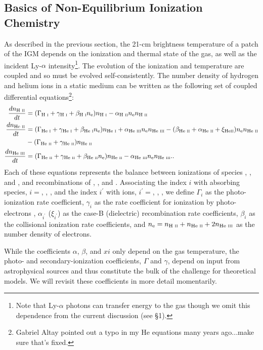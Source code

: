 \subsection{Basics of Non-Equilibrium Ionization Chemistry} \label{sec:ioniz_heating}
As described in the previous section, the 21-cm brightness temperature of a patch of the IGM depends on the ionization and thermal state of the gas, as well as the incident Ly-$\alpha$ intensity\footnote{Note that Ly-$\alpha$ photons can transfer energy to the gas though we omit this dependence from the current discussion (see \S1).}. The evolution of the ionization and temperature are coupled and so must be evolved self-consistently. The number density of hydrogen and helium ions {\color{red} in a static medium} can be written as the following set of coupled differential equations\footnote{{\color{red} Gabriel Altay pointed out a typo in my He equations many years ago...make sure that's fixed.}}:
\begin{align}
    \frac{d n_{\text{H } \textsc{ii}}}{dt} & = (\Gamma_{\text{H } \textsc{i}} + \gamma_{\text{H } \textsc{i}} + \beta_{\text{H } \textsc{i}} n_{\text{e}}) n_{\text{H } \textsc{i}} - \alpha_{\text{H } \textsc{ii}} n_{\text{e}} n_{\text{H } \textsc{ii}}   \label{eq:HIIRateEquation} \\
    \frac{d n_{\text{He } \textsc{ii}}}{dt} & = (\Gamma_{\text{He } \textsc{i}} + \gamma_{\text{He } \textsc{i}} + \beta_{\text{He } \textsc{i}} n_{\text{e}}) n_{\text{He } \textsc{i}} \nonumber + \alpha_{\text{He } \textsc{iii}} n_{\text{e}} n_{\text{He } \textsc{iii}}  - (\beta_{\text{He } \textsc{ii}} + \alpha_{\text{He } \textsc{ii}} + \xi_{\text{He} \textsc{ii}}) n_{\text{e}} n_{\text{He } \textsc{ii}} \\ & - (\Gamma_{\text{He } \textsc{ii}} + \gamma_{\text{He } \textsc{ii}}) n_{\text{He } \textsc{ii}} \label{eq:HeIIRateEquation} \\ 
    \frac{d n_{\text{He } \textsc{iii}}}{dt} & = (\Gamma_{\text{He } \textsc{ii}} + \gamma_{\text{He } \textsc{ii}} + \beta_{\text{He } \textsc{ii}} n_{\text{e}}) n_{\text{He } \textsc{ii}}  - \alpha_{\text{He } \textsc{iii}} n_{\text{e}} n_{\text{He } \textsc{iii}} . \label{eq:HeIIIRateEquation} .
\end{align}
Each of these equations represents the balance between ionizations of species
\HI, \HeI, and \HeII, and recombinations of \HII, \HeII, and
\HeIII. Associating the index $i$ with absorbing species, $i = $\HI, \HeI,
\HeII, and the index $i^{\prime}$ with ions, $i^{\prime} = $\HII, \HeII,
\HeIII, we define $\Gamma_i$ as the photo-ionization rate coefficient,
$\gamma_i$ as the rate coefficient for ionization by photo-electrons \cite[e.g.,][]{Shull1985,Furlanetto2010}, $\alpha_{i^{\prime}}$
($\xi_{i^{\prime}}$) as the case-B (dielectric) recombination rate
coefficients, $\beta_i$ as the collisional ionization rate coefficients, and
$n_{\text{e}} = n_{\text{H } \textsc{ii}} + n_{\text{He } \textsc{ii}} + 2n_{\text{He } \textsc{iii}}$ as the number density of electrons.

While the coefficients $\alpha$, $\beta$, and $xi$ only depend on the gas temperature, the photo- and secondary-ionization coefficients, $\Gamma$ and $\gamma$, depend on input from astrophysical sources and thus constitute the bulk of the challenge for theoretical models. We will revisit these coefficients in more detail momentarily.


